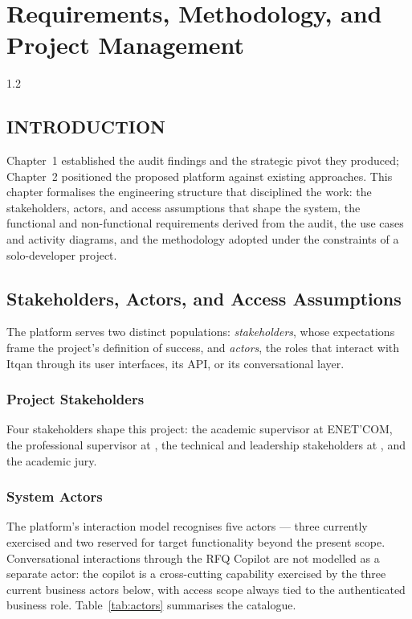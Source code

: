 \chapter{Requirements, Methodology, and Project Management}
\begin{spacing}{1.2}
\minitoc
\thispagestyle{MyStyle}
\end{spacing}
\newpage

\section*{INTRODUCTION}
Chapter~1 established the audit findings and the strategic pivot they produced; Chapter~2 positioned the proposed platform against existing approaches. This chapter formalises the engineering structure that disciplined the work: the stakeholders, actors, and access assumptions that shape the system, the functional and non-functional requirements derived from the audit, the use cases and activity diagrams, and the methodology adopted under the constraints of a solo-developer project.

\section{Stakeholders, Actors, and Access Assumptions}
The platform serves two distinct populations: \textit{stakeholders},
whose expectations frame the project's definition of success, and
\textit{actors}, the roles that interact with Itqan through its user
interfaces, its API, or its conversational layer.

\subsection{Project Stakeholders}
Four stakeholders shape this project: the academic supervisor at
ENET'COM, the professional supervisor at \hostCompany, the technical
and leadership stakeholders at \clientCompany, and the academic jury.

\subsection{System Actors}
The platform's interaction model recognises five actors --- three
currently exercised and two reserved for target functionality beyond
the present scope. Conversational interactions through the RFQ Copilot
are not modelled as a separate actor: the copilot is a cross-cutting
capability exercised by the three current business actors below, with
access scope always tied to the authenticated business role.
Table~\ref{tab:actors} summarises the catalogue.

